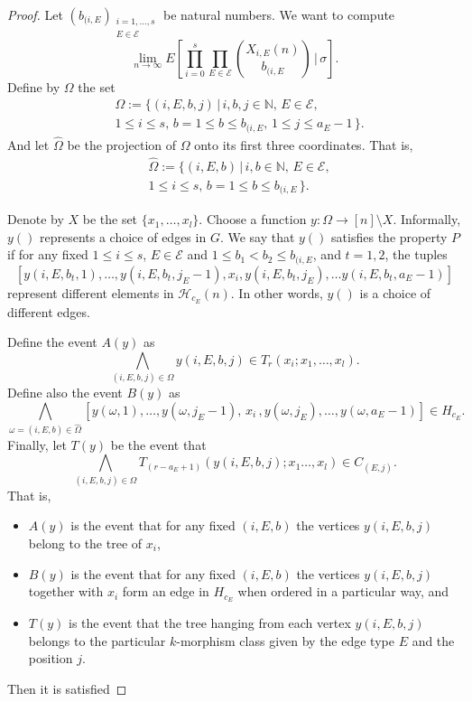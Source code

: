 \documentclass[11pt,notitlepage,a4paper]{article}
\theoremstyle{definition}
\newcommand{\N}{\mathbb{N}}
\newcommand{\Ln}{\lim\limits_{n\to \infty}}
\begin{document}
\begin{proof}
	Let $(b_{(i,E})_{\substack{i=1,\dots, s \\ E\in \mathcal{E}}}$ be 
	natural numbers. We want to compute
	\[\Ln E\left[\prod_{i=0}^{s}\prod_{E\in \mathcal{E}}
	\binom{X_{i,E}(n)}{b_{(i,E}} \, \Bigg| \, \sigma \right]. \]
	Define by $\Omega$ the set
	\begin{align*}
		&\Omega:= \{ (i,E,b,j) \, | \, i,b,j \in \N, \, E\in \mathcal{E},\\ 
		& 1\leq i \leq s, \, b=1\leq b \leq b_{(i,E}, \, 1\leq j \leq a_E-1 \,\}. 
	\end{align*} 
	And let $\hat{\Omega}$ be the projection of $\Omega$ onto its first
	three coordinates. That is,
		\begin{align*}
	&\widehat{\Omega}:= \{ (i,E,b) \, | \, i,b \in \N, \, E\in \mathcal{E},\\ 
	& 1\leq i \leq s, \, b=1\leq b \leq b_{(i,E}\,\}. 
	\end{align*} 

	
	Denote by $X$ be the set $\{x_1,\dots,x_l\}$.
	Choose a function $y: \Omega \rightarrow [n]\setminus X$. 
	Informally, $y()$ represents a choice of edges in $G$. We
	say that $y()$ satisfies the property $P$ if for any fixed
	$1\leq i\leq s$, $E\in \mathcal{E}$ and 
	$1\leq b_1 < b_2\leq b_{(i,E}$, and $t=1,2$, the tuples
	\[ [y(i,E,b_t,1),\dots, y(i,E,b_t,j_E-1), x_i, y(i,E,b_t,j_E),\dots
	y(i,E,b_t,a_E-1)] \]
	represent different elements in $\mathcal{H}_{c_E}(n)$.
	In other words, $y()$ is a choice of different edges. \par	
	Define
	the event $A(y)$ as
	\[ \bigwedge_{(i,E,b,j)\in \Omega} y(i,E,b,j)\in T_r(x_i;x_1, \dots, x_l) .\]
	Define also the event $B(y)$ as 
	\[\bigwedge_{\omega=(i,E,b)\in \widehat{\Omega}} [y(\omega,1), \dots, 
	y(\omega,j_E-1), \, x_i \, ,y(\omega,j_E),\dots,  y(\omega,a_E-1)]\in H_{c_E} .\]
	Finally, let $T(y)$ be the event that
	\[\bigwedge_{(i,E,b,j)\in \Omega} T_{(r-a_E+1)}(y(i,E,b,j);x_1
	\dots,x_l)\in C_{(E,j)}.\]
	That is, 
	\begin{itemize}[leftmargin=*]
		\item  $A(y)$ is the event that for any fixed $(i,E,b)$ the vertices $y(i,E,b,j)$ belong to the tree of $x_i$, 
		\item  $B(y)$ is the event that for any fixed $(i,E,b)$ 
		the vertices $y(i,E,b,j)$ together with $x_i$ form an edge in 
		$H_{c_E}$ when ordered in a particular way, and
		\item $T(y)$ is the event that the tree hanging from
		each vertex $y(i,E,b,j)$ belongs to the particular $k$-morphism
		class given by the edge type $E$ and the position $j$. 	 	 
	\end{itemize}
	Then it is satisfied 
	

\end{proof}
\end{document}
